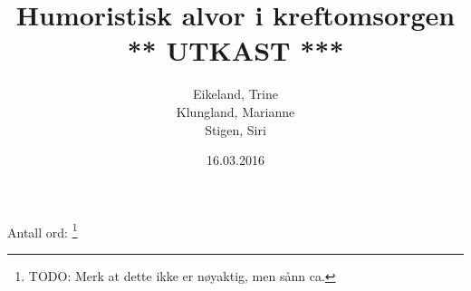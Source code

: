 \documentclass[a4paper,norsk,12pt]{report}
\begin{document}
  \author{Eikeland, Trine\\Klungland, Marianne\\Stigen, Siri}
  \date{16.03.2016}
  \title{Humoristisk alvor i kreftomsorgen \\
    {\Huge{\sffamily *** UTKAST ***}}}

  
  \begin{abstract}
  
  \end{abstract}

  \tableofcontents

  Antall ord: \footnote{TODO: Merk at dette ikke er
  nøyaktig, men sånn ca.}
  \clearpage

  \renewcommand{\arraystretch}{1.2}

  
  
  
  
  
  
  
  \clearpage

  \begingroup %
  \raggedright %
  \nocite{*} %
  
  \endgroup %

  \appendix
  
  \clearpage %
  \printindex
\end{document}
